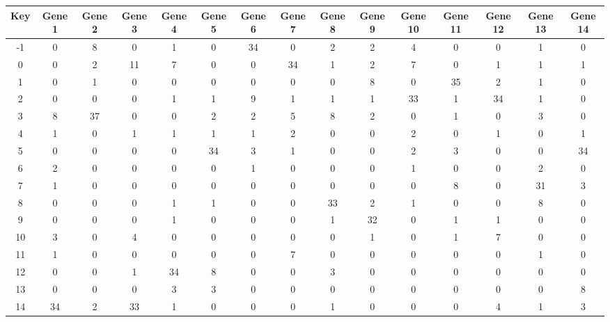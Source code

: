 \begin{tabular}{|c|c|c|c|c|c|c|c|c|c|c|c|c|c|c|}
\hline
Key & Gene 1 & Gene 2 & Gene 3 & Gene 4 & Gene 5 & Gene 6 & Gene 7 & Gene 8 & Gene 9 & Gene 10 & Gene 11 & Gene 12 & Gene 13 & Gene 14 \\
\hline
-1 & 0 & 8 & 0 & 1 & 0 & 34 & 0 & 2 & 2 & 4 & 0 & 0 & 1 & 0 \\
0 & 0 & 2 & 11 & 7 & 0 & 0 & 34 & 1 & 2 & 7 & 0 & 1 & 1 & 1 \\
1 & 0 & 1 & 0 & 0 & 0 & 0 & 0 & 0 & 8 & 0 & 35 & 2 & 1 & 0 \\
2 & 0 & 0 & 0 & 1 & 1 & 9 & 1 & 1 & 1 & 33 & 1 & 34 & 1 & 0 \\
3 & 8 & 37 & 0 & 0 & 2 & 2 & 5 & 8 & 2 & 0 & 1 & 0 & 3 & 0 \\
4 & 1 & 0 & 1 & 1 & 1 & 1 & 2 & 0 & 0 & 2 & 0 & 1 & 0 & 1 \\
5 & 0 & 0 & 0 & 0 & 34 & 3 & 1 & 0 & 0 & 2 & 3 & 0 & 0 & 34 \\
6 & 2 & 0 & 0 & 0 & 0 & 1 & 0 & 0 & 0 & 1 & 0 & 0 & 2 & 0 \\
7 & 1 & 0 & 0 & 0 & 0 & 0 & 0 & 0 & 0 & 0 & 8 & 0 & 31 & 3 \\
8 & 0 & 0 & 0 & 1 & 1 & 0 & 0 & 33 & 2 & 1 & 0 & 0 & 8 & 0 \\
9 & 0 & 0 & 0 & 1 & 0 & 0 & 0 & 1 & 32 & 0 & 1 & 1 & 0 & 0 \\
10 & 3 & 0 & 4 & 0 & 0 & 0 & 0 & 0 & 1 & 0 & 1 & 7 & 0 & 0 \\
11 & 1 & 0 & 0 & 0 & 0 & 0 & 7 & 0 & 0 & 0 & 0 & 0 & 1 & 0 \\
12 & 0 & 0 & 1 & 34 & 8 & 0 & 0 & 3 & 0 & 0 & 0 & 0 & 0 & 0 \\
13 & 0 & 0 & 0 & 3 & 3 & 0 & 0 & 0 & 0 & 0 & 0 & 0 & 0 & 8 \\
14 & 34 & 2 & 33 & 1 & 0 & 0 & 0 & 1 & 0 & 0 & 0 & 4 & 1 & 3 \\
\hline
\end{tabular}